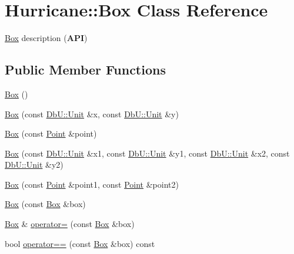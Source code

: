 \hypertarget{classHurricane_1_1Box}{}\section{Hurricane\+:\+:Box Class Reference}
\label{classHurricane_1_1Box}


\hyperlink{classHurricane_1_1Box}{Box} description ({\bfseries A\+PI})  


\subsection*{Public Member Functions}
\begin{DoxyCompactItemize}
\item 
\hyperlink{classHurricane_1_1Box_a445dd24bf83759bb47fc483fc7da024f}{Box} ()
\item 
\hyperlink{classHurricane_1_1Box_af53adb323e9e89eef4e96da9efc33fe9}{Box} (const \hyperlink{group__DbUGroup_ga4fbfa3e8c89347af76c9628ea06c4146}{Db\+U\+::\+Unit} \&x, const \hyperlink{group__DbUGroup_ga4fbfa3e8c89347af76c9628ea06c4146}{Db\+U\+::\+Unit} \&y)
\item 
\hyperlink{classHurricane_1_1Box_a2f2aa57fa9486b508fca2a060648d04a}{Box} (const \hyperlink{classHurricane_1_1Point}{Point} \&point)
\item 
\hyperlink{classHurricane_1_1Box_a101cd5a10d6cf229ccedccbb5417ed55}{Box} (const \hyperlink{group__DbUGroup_ga4fbfa3e8c89347af76c9628ea06c4146}{Db\+U\+::\+Unit} \&x1, const \hyperlink{group__DbUGroup_ga4fbfa3e8c89347af76c9628ea06c4146}{Db\+U\+::\+Unit} \&y1, const \hyperlink{group__DbUGroup_ga4fbfa3e8c89347af76c9628ea06c4146}{Db\+U\+::\+Unit} \&x2, const \hyperlink{group__DbUGroup_ga4fbfa3e8c89347af76c9628ea06c4146}{Db\+U\+::\+Unit} \&y2)
\item 
\hyperlink{classHurricane_1_1Box_a47f434b4dbda6af14a354722f66a47da}{Box} (const \hyperlink{classHurricane_1_1Point}{Point} \&point1, const \hyperlink{classHurricane_1_1Point}{Point} \&point2)
\item 
\hyperlink{classHurricane_1_1Box_af9a7605270bf1ebb38723fba5b9d9236}{Box} (const \hyperlink{classHurricane_1_1Box}{Box} \&box)
\item 
\hyperlink{classHurricane_1_1Box}{Box} \& \hyperlink{classHurricane_1_1Box_a01abf59b3d3e99e694a7d4789f1bb978}{operator=} (const \hyperlink{classHurricane_1_1Box}{Box} \&box)
\item 
bool \hyperlink{classHurricane_1_1Box_a2a363ad0fdfda5a2f56b1b62a8665703}{operator==} (const \hyperlink{classHurricane_1_1Box}{Box} \&box) const

\end{DoxyCompactItemize}
